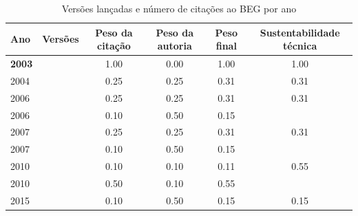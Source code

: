 \begin{table}[H]
\caption{Versões lançadas e número de citações ao BEG por ano}
\centering
\begin{tabular}{| l | c | c | c | c | c |}
  \hline
  Ano & Versões & Peso da citação & Peso da autoria & Peso final & Sustentabilidade técnica \\
  \hline
            {\bf 2003}
          &
          
          &
          1.00
          &
          0.00
          &
          1.00
          &
            {\color{blue} 1.00}
          \\
\hline
            2004
          &
          
          &
          0.25
          &
          0.25
          &
          0.31
          &
            {\color{red} 0.31}
          \\
\hline
            2006
          &
          
          &
          0.25
          &
          0.25
          &
          0.31
          &
            {\color{red} 0.31}
          \\
            2006
          &
          
          &
          0.10
          &
          0.50
          &
          0.15
          &
          \\
\hline
            2007
          &
          
          &
          0.25
          &
          0.25
          &
          0.31
          &
            {\color{red} 0.31}
          \\
            2007
          &
          
          &
          0.10
          &
          0.50
          &
          0.15
          &
          \\
\hline
            2010
          &
          
          &
          0.10
          &
          0.10
          &
          0.11
          &
            {\color{blue} 0.55}
          \\
            2010
          &
          
          &
          0.50
          &
          0.10
          &
          0.55
          &
          \\
\hline
            2015
          &
          
          &
          0.10
          &
          0.50
          &
          0.15
          &
            {\color{red} 0.15}
          \\
\hline
\end{tabular}
\end{table}

